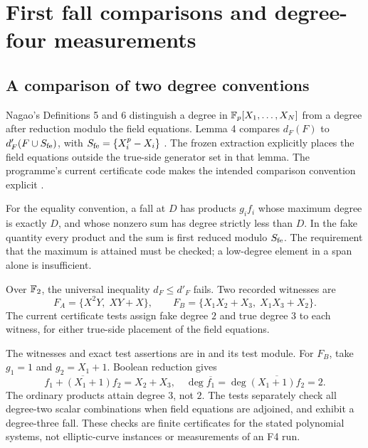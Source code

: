 \section{First fall comparisons and degree-four measurements}
\subsection{A comparison of two degree conventions}

Nagao's Definitions 5 and 6 distinguish a degree in
$\mathbb F_p[X_1,\ldots,X_N]$ from a degree after reduction modulo the field
equations. Lemma 4 compares $d_F(F)$ to $d'_F(F\cup S_{\rm fe})$, with
$S_{\rm fe}=\{X_i^p-X_i\}$ \cite{nagao2015}. The frozen extraction explicitly
places the field equations outside the true-side generator set in that
lemma. The programme's current certificate code makes the intended
comparison convention explicit \cite{nagaoCertificate}.

For the equality convention, a fall at $D$ has products $g_i f_i$ whose
maximum degree is exactly $D$, and whose nonzero sum has degree strictly
less than $D$. In the fake quantity every product and the sum is first
reduced modulo $S_{\rm fe}$. The requirement that the maximum is attained
must be checked; a low-degree element in a span alone is insufficient.

\begin{proposition}
Over $\mathbb F_2$, the universal inequality $d_F\leq d'_F$ fails. Two recorded
witnesses are
\[
 F_A=\{X^2Y,\;XY+X\},\qquad
 F_B=\{X_1X_2+X_3,\;X_1X_3+X_2\}.
\]
The current certificate tests assign fake degree $2$ and true degree $3$
to each witness, for either true-side placement of the field equations.
\end{proposition}

The witnesses and exact test assertions are in
 and its test module.
For $F_B$, take $g_1=1$ and $g_2=X_1+1$. Boolean reduction gives
\[
 \overline{f_1+(X_1+1)f_2}=X_2+X_3,
 \quad \deg\overline{f_1}=\deg\overline{(X_1+1)f_2}=2.
\]
The ordinary products attain degree $3$, not $2$. The tests separately
check all degree-two scalar combinations when field equations are
adjoined, and exhibit a degree-three fall. These checks are finite
certificates for the stated polynomial systems, not elliptic-curve
instances or measurements of an F4 run.

